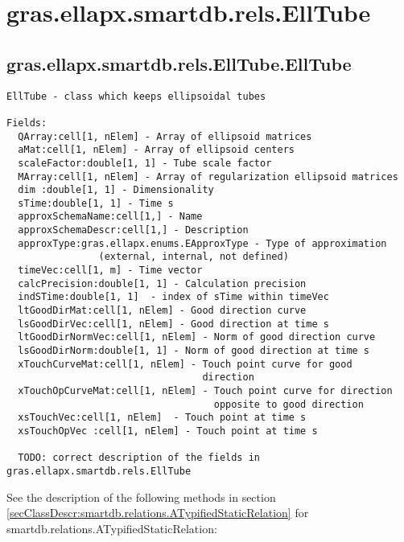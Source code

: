 \section{gras.ellapx.smartdb.rels.EllTube}\label{secClassDescr:gras.ellapx.smartdb.rels.EllTube}
\subsection{\texorpdfstring{gras.ellapx.smartdb.rels.EllTube.EllTube}{EllTube}}\label{method:gras.ellapx.smartdb.rels.EllTube.EllTube}
\begin{verbatim}
EllTube - class which keeps ellipsoidal tubes

Fields:
  QArray:cell[1, nElem] - Array of ellipsoid matrices
  aMat:cell[1, nElem] - Array of ellipsoid centers
  scaleFactor:double[1, 1] - Tube scale factor
  MArray:cell[1, nElem] - Array of regularization ellipsoid matrices
  dim :double[1, 1] - Dimensionality
  sTime:double[1, 1] - Time s
  approxSchemaName:cell[1,] - Name
  approxSchemaDescr:cell[1,] - Description
  approxType:gras.ellapx.enums.EApproxType - Type of approximation
                (external, internal, not defined)
  timeVec:cell[1, m] - Time vector
  calcPrecision:double[1, 1] - Calculation precision
  indSTime:double[1, 1]  - index of sTime within timeVec
  ltGoodDirMat:cell[1, nElem] - Good direction curve
  lsGoodDirVec:cell[1, nElem] - Good direction at time s
  ltGoodDirNormVec:cell[1, nElem] - Norm of good direction curve
  lsGoodDirNorm:double[1, 1] - Norm of good direction at time s
  xTouchCurveMat:cell[1, nElem] - Touch point curve for good
                                  direction
  xTouchOpCurveMat:cell[1, nElem] - Touch point curve for direction
                                    opposite to good direction
  xsTouchVec:cell[1, nElem]  - Touch point at time s
  xsTouchOpVec :cell[1, nElem] - Touch point at time s

  TODO: correct description of the fields in gras.ellapx.smartdb.rels.EllTube
\end{verbatim}


See the description of the following methods in section \ref{secClassDescr:smartdb.relations.ATypifiedStaticRelation}
 for smartdb.relations.ATypifiedStaticRelation:


